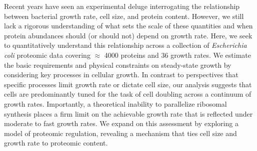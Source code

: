 

Recent years have seen an experimental deluge interrogating the relationship
between bacterial growth rate, cell size, and protein content. However, we still
lack a rigorous understanding of what sets the scale of these quantities and
when protein abundances should (or should not) depend on growth rate. Here, we
seek to quantitatively understand this relationship across a collection of
\textit{Escherichia coli} proteomic data covering $\approx$ 4000 proteins and 36
growth rates. We estimate the basic requirements and physical constraints on
steady-state growth by considering key processes in cellular growth. In contrast
to perspectives that specific processes limit growth rate or dictate cell size,
our analysis suggests that cells are predominantly tuned for the task of cell
doubling  across a continuum of growth rates. Importantly, a theoretical
inability to parallelize ribosomal synthesis places a firm limit on the
achievable growth rate that is reflected under moderate to fast growth rates. We
expand on this assessment by exploring a model of proteomic regulation,
revealing a mechanism that ties cell size and growth rate to proteomic content.
